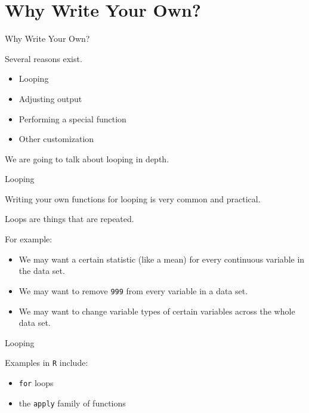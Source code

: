 \section{Why Write Your Own?}\label{why-write-your-own}

\begin{frame}{Why Write Your Own?}

Several reasons exist.

\begin{itemize}
\tightlist
\item
  Looping
\item
  Adjusting output
\item
  Performing a special function
\item
  Other customization
\end{itemize}

We are going to talk about looping in depth.

\end{frame}

\begin{frame}[fragile]{Looping}

Writing your own functions for looping is very common and practical.

Loops are things that are repeated.

For example:

\begin{itemize}
\tightlist
\item
  We may want a certain statistic (like a mean) for every continuous
  variable in the data set.
\item
  We may want to remove \texttt{999} from every variable in a data set.
\item
  We may want to change variable types of certain variables across the
  whole data set.
\end{itemize}

\end{frame}

\begin{frame}[fragile]{Looping}

Examples in \texttt{R} include:

\begin{itemize}
\tightlist
\item
  \texttt{for} loops
\item
  the \texttt{apply} family of functions
\end{itemize}

\end{frame}

